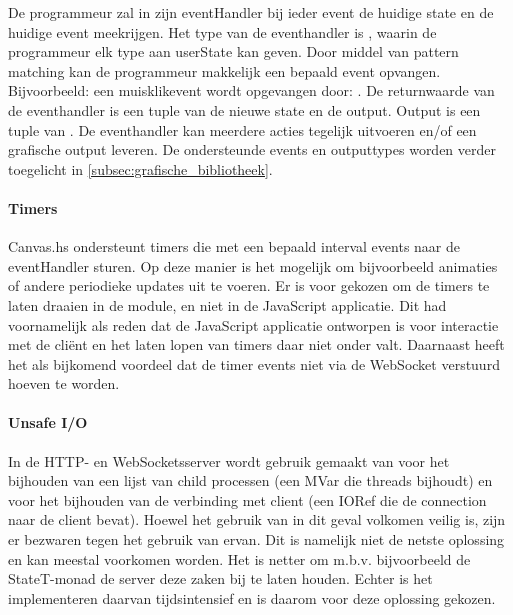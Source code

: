 De programmeur zal in zijn eventHandler bij ieder event de huidige state en de huidige event meekrijgen. Het type van de eventhandler is , waarin de programmeur elk type aan userState kan geven. Door middel van pattern matching kan de programmeur makkelijk een bepaald event opvangen. Bijvoorbeeld: een muisklikevent wordt opgevangen door: . De returnwaarde van de eventhandler is een tuple van de nieuwe state en de output. Output is een tuple van . De eventhandler kan meerdere acties tegelijk uitvoeren en/of een grafische output leveren. De ondersteunde events en outputtypes worden verder toegelicht in \autoref{subsec:grafische_bibliotheek}.

\paragraph{Timers}
Canvas.hs ondersteunt timers die met een bepaald interval events naar de eventHandler sturen. Op deze manier is het mogelijk om bijvoorbeeld animaties of andere periodieke updates uit te voeren. Er is voor gekozen om de timers te laten draaien in de module, en niet in de JavaScript applicatie. Dit had voornamelijk als reden dat de JavaScript applicatie ontworpen is voor interactie met de cliënt en het laten lopen van timers daar niet onder valt. Daarnaast heeft het als bijkomend voordeel dat de timer events niet via de WebSocket verstuurd hoeven te worden.

\paragraph{Unsafe I/O}
In de HTTP- en WebSocketsserver wordt gebruik gemaakt van  voor het bijhouden van een lijst van child processen (een MVar die threads bijhoudt) en voor het bijhouden van de verbinding met client (een IORef die de connection naar de client bevat). Hoewel het gebruik van  in dit geval volkomen veilig is, zijn er bezwaren tegen het gebruik van ervan\cite{Haskell.org2008}. Dit is namelijk niet de netste oplossing en kan meestal voorkomen worden. Het is netter om m.b.v. bijvoorbeeld de StateT-monad de server deze zaken bij te laten houden. Echter is het implementeren daarvan tijdsintensief en is daarom voor deze oplossing gekozen.